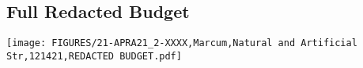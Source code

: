 \documentclass[usenames,dvipsnames,modern]{CLASS_FILES/aastex631}  %
\begin{document}
\newpage


\newpage
\subsection{Full Redacted Budget}
\begin{figure*}[b!]
 \begin{center}
\texttt{[image: FIGURES/21-APRA21\_2-XXXX,Marcum,Natural and Artificial Str,121421,REDACTED BUDGET.pdf]}
\vspace{-0.85cm}
\end{center}
\end{figure*}



\
\end{document}
